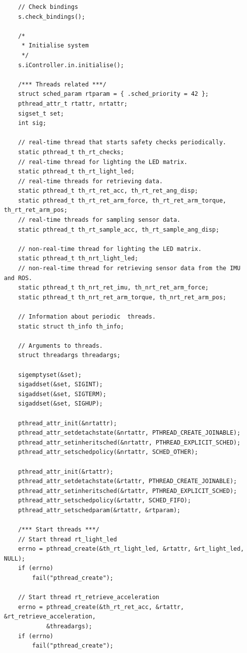 \documentclass[12pt]{scrreprt}
\begin{document}
\begin{appendices}
\begin{verbatim}
    // Check bindings
    s.check_bindings();

    /*
     * Initialise system
     */
    s.iController.in.initialise();

    /*** Threads related ***/
    struct sched_param rtparam = { .sched_priority = 42 };
    pthread_attr_t rtattr, nrtattr;
    sigset_t set;
    int sig;

    // real-time thread that starts safety checks periodically.
    static pthread_t th_rt_checks;
    // real-time thread for lighting the LED matrix.
    static pthread_t th_rt_light_led;
    // real-time threads for retrieving data.
    static pthread_t th_rt_ret_acc, th_rt_ret_ang_disp;
    static pthread_t th_rt_ret_arm_force, th_rt_ret_arm_torque, th_rt_ret_arm_pos;
    // real-time threads for sampling sensor data.
    static pthread_t th_rt_sample_acc, th_rt_sample_ang_disp;

    // non-real-time thread for lighting the LED matrix.
    static pthread_t th_nrt_light_led;
    // non-real-time thread for retrieving sensor data from the IMU and ROS.
    static pthread_t th_nrt_ret_imu, th_nrt_ret_arm_force;
    static pthread_t th_nrt_ret_arm_torque, th_nrt_ret_arm_pos;

    // Information about periodic  threads.
    static struct th_info th_info;

    // Arguments to threads.
    struct threadargs threadargs;

    sigemptyset(&set);
    sigaddset(&set, SIGINT);
    sigaddset(&set, SIGTERM);
    sigaddset(&set, SIGHUP);

    pthread_attr_init(&nrtattr);
    pthread_attr_setdetachstate(&nrtattr, PTHREAD_CREATE_JOINABLE);
    pthread_attr_setinheritsched(&nrtattr, PTHREAD_EXPLICIT_SCHED);
    pthread_attr_setschedpolicy(&nrtattr, SCHED_OTHER);

    pthread_attr_init(&rtattr);
    pthread_attr_setdetachstate(&rtattr, PTHREAD_CREATE_JOINABLE);
    pthread_attr_setinheritsched(&rtattr, PTHREAD_EXPLICIT_SCHED);
    pthread_attr_setschedpolicy(&rtattr, SCHED_FIFO);
    pthread_attr_setschedparam(&rtattr, &rtparam);

    /*** Start threads ***/
    // Start thread rt_light_led
    errno = pthread_create(&th_rt_light_led, &rtattr, &rt_light_led, NULL);
    if (errno)
        fail("pthread_create");

    // Start thread rt_retrieve_acceleration
    errno = pthread_create(&th_rt_ret_acc, &rtattr, &rt_retrieve_acceleration,
            &threadargs);
    if (errno)
        fail("pthread_create");


\end{verbatim}
\end{appendices}
\end{document}
